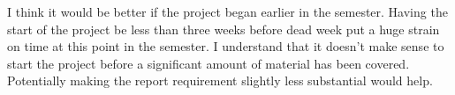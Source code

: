 \documentclass{article} %
\begin{document}
I think it would be better if the project began earlier in the semester.
Having the start of the project be less than three weeks before dead week put a huge strain on time at this point in the semester.
I understand that it doesn't make sense to start the project before a significant amount of material has been covered.
Potentially making the report requirement slightly less substantial would help.



\end{document}
